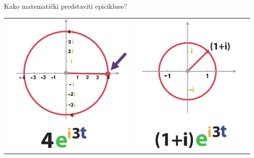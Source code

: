 \documentclass{beamer}
\begin{document}
\begin{frame}{Kako matemati\v{c}ki predstaviti epicikluse?}
    \begin{tabular}{cc}
        \includegraphics[scale=0.3]{images/ep4.PNG} &
        \includegraphics[scale=0.35]{images/ep5.PNG}            
    \end{tabular}
\end{frame}
\end{document}

